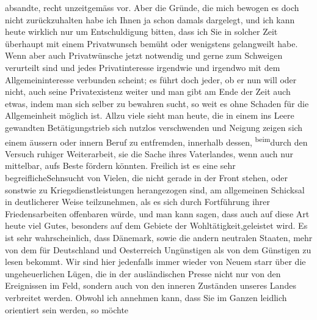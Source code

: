 \begin{ledgroupsized}[t]{13cm}
                    absandte, recht unzeitgemäss vor. Aber die Gründe, die mich bewogen es doch
                    nicht zurückzuhalten habe ich Ihnen ja 
               schon damals dargelegt\introOben{},\introOben{} und ich kann heute wirklich nur um Entschuldigung
                    bitten, dass ich Sie in solcher Zeit überhaupt mit einem Privatwunsch bemüht
                    oder wenigstens gelangweilt habe. Wenn aber auch Privatwünsche jetzt notwendig
                    und gerne zum Schweigen verurteilt sind und jedes Privatinteresse irgendwie und
                    irgendwo mit dem Allgemeininteresse verbunden scheint; es führt {\pb}doch jeder, ob er nun will oder nicht, auch
                    seine Privatexistenz weiter und man gibt am Ende der Zeit auch etwas, indem man
                    sich selber zu bewahren sucht, so weit es ohne Schaden für die Allgemeinheit
                    möglich ist. Allzu viele sieht man heute, die in einem ins Leere gewandten
                    Betätigungstrieb sich nutzlos verschwenden und Neigung zeigen sich einem äussern
                    oder innern Beruf zu entfremden, innerhalb dessen, \substVorne{}\textsuperscript{beim}\substDazwischen{}durch den\substHinten{} Versuch ruhiger Weiterarbeit, sie die Sache ihres Vaterlandes, wenn
                    auch nur mittelbar, aufs Beste fördern könnten. Freilich ist \introOben{}es eine sehr begreifliche\introOben{}Sehnsucht
                    von Vielen, die nicht gerade in der Front stehen, oder sonstwie zu
                    Kriegsdienstleistungen herangezogen sind, am allgemeinen Schicksal in
                    deutlicherer Weise teilzunehmen, als es sich durch Fortführung ihrer
                    Friedensarbeiten offenbaren würde, und man kann sagen, dass auch auf diese Art
                    heute viel Gutes, besonders auf dem Gebiete der Wohltätigkeit,geleistet
                    wird.\pend
           \pstart
           Es ist sehr wahrscheinlich, dass {\pb}Dänemark, sowie die andern neutralen Staaten,
                    mehr von dem für Deutschland und Oesterreich Ungünstigen als von dem Günstigen
                    zu lesen bekommt. Wir sind hier jedenfalls immer wieder von Neuem starr über die
                    ungeheuerlichen Lügen, die in der ausländischen Presse nicht nur von den
                    Ereignissen im Feld, sondern auch von den inneren Zuständen unseres Landes
                    verbreitet werden. Obwohl ich annehmen kann, dass Sie im Ganzen \label{LL710-1v}\label{LL710-1h}leidlich orientiert sein werden, so möchte

\end{ledgroupsized}
